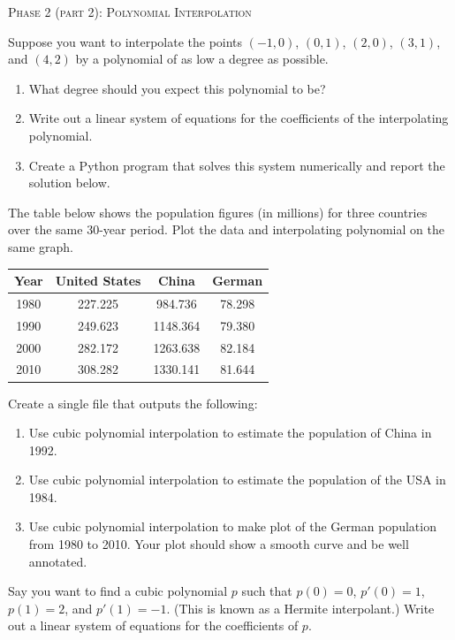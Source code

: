 \documentclass[10pt]{article}
\begin{document}
\begin{center}
\Large{\textsc{Phase 2 (part 2): Polynomial Interpolation }}\\
\end{center}

\begin{enumerate}[{$1.]$}]

\item Suppose you want to interpolate the points $(-1, 0)$, $(0,1)$, $(2,0)$, $(3,1)$, and $(4,2)$ by a polynomial of as low a degree as possible. 

\begin{enumerate}[{$\quad a.)$}]
	\item What degree should you expect this polynomial to be?  \vspace{2cm}
	\item Write out a linear system of equations for the coefficients of the interpolating polynomial.  \vfill
	\item Create a Python program that solves this system numerically and report the solution below. \vspace{3cm} 
\end{enumerate}


\pagebreak
\item The table below shows the population figures (in millions) for three countries over the same 30-year period.  Plot the data and interpolating polynomial on the same graph. 

\begin{center}
\begin{tabular}{ c   c   c  c}
\hline
Year & United States & China & German \\ 
\hline
1980 & 227.225 & 984.736 & 78.298  \\ 
1990 & 249.623 & 1148.364 & 79.380 \\ 
2000 & 282.172 & 1263.638 & 82.184 \\ 
2010 & 308.282 & 1330.141 & 81.644 \\\hline \hline
\end{tabular}
\end{center}

Create a single file that outputs the following: 
\begin{enumerate}[{$\quad a.)$}]
	\item Use cubic polynomial interpolation to estimate the population of China in 1992. 
	\item Use cubic polynomial interpolation to estimate the population of the USA in 1984. 
	\item Use cubic polynomial interpolation to make plot of the German population from 1980 to 2010.  Your plot should show a smooth curve and be well annotated. 
\end{enumerate}




\item Say you want to find a cubic polynomial $p$ such that $p(0) = 0$, $p'(0) = 1$, $p(1) = 2$, and $p'(1) = -1$.  (This is known as a Hermite interpolant.)  Write out a linear system of equations for the coefficients of $p$. \vfill

\end{enumerate}
\end{document}
